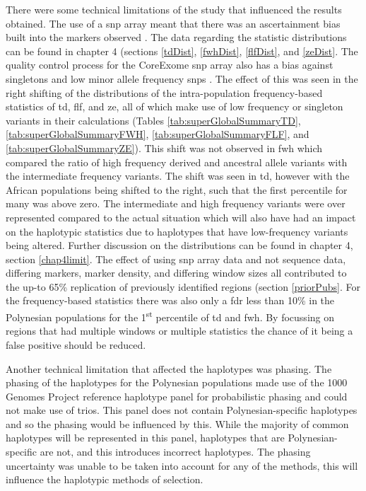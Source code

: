 \documentclass[]{report}
\begin{document}
There were some technical limitations of the study that influenced the
results obtained. The use of a \gls{snp} array meant that there was an
ascertainment bias built into the markers observed
\citep{nielsen2007recent}. The data regarding the statistic
distributions can be found in chapter 4 (sections \ref{tdDist},
\ref{fwhDist}, \ref{flfDist}, and \ref{zeDist}. The quality control
process for the CoreExome \gls{snp} array also has a bias against
singletons and low minor allele frequency \glspl{snp} \citep{Guo2014}.
The effect of this was seen in the right shifting of the distributions
of the intra-population frequency-based statistics of \gls{td},
\gls{flf}, and \gls{ze}, all of which make use of low frequency or
singleton variants in their calculations (Tables
\ref{tab:superGlobalSummaryTD}, \ref{tab:superGlobalSummaryFWH},
\ref{tab:superGlobalSummaryFLF}, and \ref{tab:superGlobalSummaryZE}).
This shift was not observed in \gls{fwh} which compared the ratio of
high frequency derived and ancestral allele variants with the
intermediate frequency variants. The shift was seen in \gls{td}, however
with the African populations being shifted to the right, such that the
first percentile for many was above zero. The intermediate and high
frequency variants were over represented compared to the actual
situation which will also have had an impact on the haplotypic
statistics due to haplotypes that have low-frequency variants being
altered. Further discussion on the distributions can be found in chapter
4, section \ref{chap4limit}. The effect of using \gls{snp} array data
and not sequence data, differing markers, marker density, and differing
window sizes all contributed to the up-to 65\% replication of previously
identified regions (section \ref{priorPubs}. For the frequency-based
statistics there was also only a \gls{fdr} less than 10\% in the
Polynesian populations for the 1\textsuperscript{st} percentile of
\gls{td} and \gls{fwh}. By focussing on regions that had multiple
windows or multiple statistics the chance of it being a false positive
should be reduced.

Another technical limitation that affected the haplotypes was phasing.
The phasing of the haplotypes for the Polynesian populations made use of
the 1000 Genomes Project reference haplotype panel for probabilistic
phasing and could not make use of trios. This panel does not contain
Polynesian-specific haplotypes and so the phasing would be influenced by
this. While the majority of common haplotypes will be represented in
this panel, haplotypes that are Polynesian-specific are not, and this
introduces incorrect haplotypes. The phasing uncertainty was unable to
be taken into account for any of the methods, this will influence the
haplotypic methods of selection.
\end{document}
